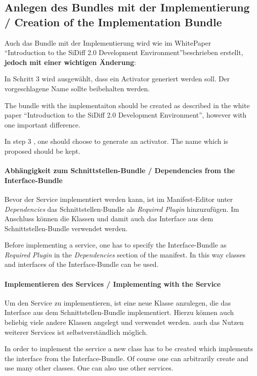\documentclass[10pt,a4paper]{scrartcl}
\providecommand{\deng}[2]{#1 / {\sffamily #2}}
\providecommand{\deutsch}[1]{#1}
\providecommand{\englisch}[1]{{\sffamily #1}}
\begin{document}
\subsection{\deng{Anlegen des Bundles mit der Implementierung}{Creation of the Implementation Bundle}}
\deutsch{Auch das Bundle mit der Implementierung wird wie im WhitePaper
``Introduction to the SiDiff 2.0 Development Environment''beschrieben erstellt,
\textbf{jedoch mit einer wichtigen Änderung}:

In Schritt 3 wird ausgewählt, dass ein Activator generiert werden soll. Der
vorgeschlagene Name sollte beibehalten werden.}

\englisch{The bundle with the implementaiton should be created as described in
the white paper ``Introduction to the SiDiff 2.0 Development Environment'',
however with one important difference.

In step 3 , one should choose to generate an activator. The name which is
proposed should be kept.}


\paragraph{\deng{Abhängigkeit zum Schnittstellen-Bundle}{Dependencies from the Interface-Bundle}}
\deutsch{Bevor der Service implementiert werden kann, ist im Manifest-Editor unter
\emph{Dependencies} das Schnittstellen-Bundle als \emph{Required Plugin}
hinzuzufügen. Im Anschluss können die Klassen und damit auch das Interface
aus dem Schnittstellen-Bundle verwendet werden.}

\englisch{Before implementing a service, one has to specify the Interface-Bundle
as \emph{Required Plugin} in the \emph{Dependencies} section of the manifest. In
this way classes and interfaces of the Interface-Bundle can be used.}


\paragraph{\deng{Implementieren des Services}{Implementing with the Service}}
\deutsch{Um den Service zu implementieren, ist eine neue Klasse anzulegen, die das
Interface aus dem Schnittstellen-Bundle implementiert. Hierzu können auch beliebig
viele andere Klassen angelegt und verwendet werden. auch das Nutzen weiterer
Services ist selbstverständlich möglich.}

\englisch{In order to implement the service a new class has to be created which
implements the interface from the Interface-Bundle. Of course one can arbitrarily
create and use many other classes. One can also use other services.}
\end{document}
